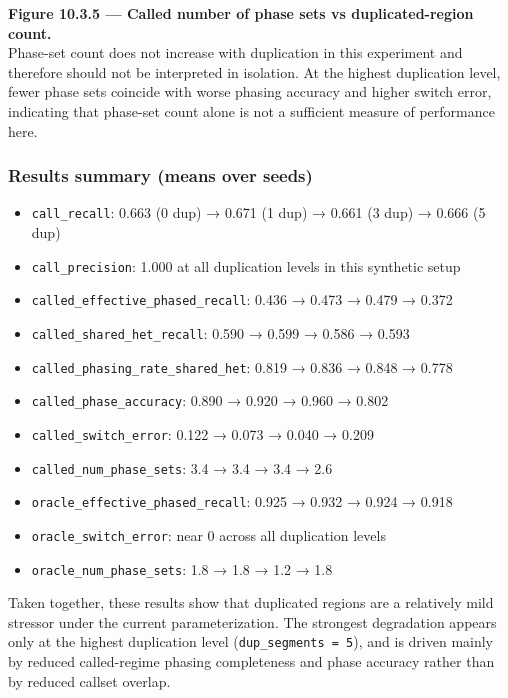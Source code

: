 \documentclass[
]{article}
\providecommand{\tightlist}{%
  \setlength{\itemsep}{0pt}\setlength{\parskip}{0pt}}
\begin{document}
\textbf{Figure 10.3.5 --- Called number of phase sets vs
duplicated-region count.}\\
Phase-set count does not increase with duplication in this experiment
and therefore should not be interpreted in isolation. At the highest
duplication level, fewer phase sets coincide with worse phasing accuracy
and higher switch error, indicating that phase-set count alone is not a
sufficient measure of performance here.

\subsubsection{Results summary (means over
seeds)}\label{results-summary-means-over-seeds-1}

\begin{itemize}
\tightlist
\item
  \texttt{call\_recall}: 0.663 (0 dup) → 0.671 (1 dup) → 0.661 (3 dup) →
  0.666 (5 dup)
\item
  \texttt{call\_precision}: 1.000 at all duplication levels in this
  synthetic setup
\item
  \texttt{called\_effective\_phased\_recall}: 0.436 → 0.473 → 0.479 →
  0.372
\item
  \texttt{called\_shared\_het\_recall}: 0.590 → 0.599 → 0.586 → 0.593
\item
  \texttt{called\_phasing\_rate\_shared\_het}: 0.819 → 0.836 → 0.848 →
  0.778
\item
  \texttt{called\_phase\_accuracy}: 0.890 → 0.920 → 0.960 → 0.802
\item
  \texttt{called\_switch\_error}: 0.122 → 0.073 → 0.040 → 0.209
\item
  \texttt{called\_num\_phase\_sets}: 3.4 → 3.4 → 3.4 → 2.6
\item
  \texttt{oracle\_effective\_phased\_recall}: 0.925 → 0.932 → 0.924 →
  0.918
\item
  \texttt{oracle\_switch\_error}: near 0 across all duplication levels
\item
  \texttt{oracle\_num\_phase\_sets}: 1.8 → 1.8 → 1.2 → 1.8
\end{itemize}

Taken together, these results show that duplicated regions are a
relatively mild stressor under the current parameterization. The
strongest degradation appears only at the highest duplication level
(\texttt{dup\_segments\ =\ 5}), and is driven mainly by reduced
called-regime phasing completeness and phase accuracy rather than by
reduced callset overlap.
\end{document}
